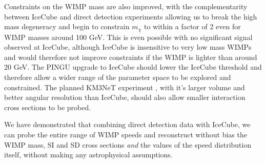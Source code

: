 Constraints on the WIMP mass are also improved, with the complementarity between IceCube and direct detection experiments allowing us to break the high mass degeneracy and begin to constrain $m_\chi$ to within a factor of 2 even for WIMP masses around 100 GeV. This is even possible with no significant signal observed at IceCube, although IceCube is insensitive to very low mass WIMPs and would therefore not improve constraints if the WIMP is lighter than around 20 GeV. The PINGU upgrade to IceCube \cite{Aartsen:2014} should lower the IceCube threshold and therefore allow a wider range of the parameter space to be explored and constrained. The planned KM3NeT experiment \cite{Biagi:2012}, with it's larger volume and better angular resolution than IceCube, should also allow smaller interaction cross sections to be probed.

We have demonstrated that combining direct detection data with IceCube, we can probe the entire range of WIMP speeds and reconstruct without bias the WIMP mass, SI and SD cross sections \textit{and} the values of the speed distribution itself, without making any astrophysical assumptions.




